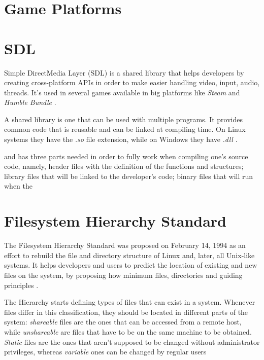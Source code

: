 \section{Game Platforms}
\label {sec:game_platforms}


\section{SDL}
\label {sec:sdl}

Simple DirectMedia Layer (SDL) is a shared library that helps developers by creating cross-platform APIs in order to make easier handling video, input, audio, threads. It's used in several games available in big platforms like \textit{Steam} and \textit{Humble Bundle} \cite{sdl2017}.

A shared library is one that can be used with multiple programs. It provides common code that is reusable and can be linked at compiling time. On Linux systems they have the \textit{.so} file extension, while on Windows they have \textit{.dll} \cite{howto2017shared}.

and has three parts needed in order to fully work when compiling one's source code, namely, header files with the definition of the functions and structures; library files that will be linked to the developer's code; binary files that will run when the


\section{Filesystem Hierarchy Standard}
\label {sec:fhs}

The Filesystem Hierarchy Standard was proposed on February 14, 1994 as an effort to rebuild the file and directory structure of Linux and, later, all Unix-like systems. It helps developers and users to predict the location of existing and new files on the system, by proposing how minimum files, directories and guiding principles \cite{allbery2015filesystem}.

The Hierarchy starts defining types of files that can exist in a system. Whenever files differ in this classification, they should be located in different parts of the system: \textit{shareable} files are the ones that can be accessed from a remote host, while \textit{unshareable} are files that have to be on the same machine to be obtained. \textit{Static} files are the ones that aren't supposed to be changed without administrator privileges, whereas \textit{variable} ones can be changed by regular users \cite{allbery2015filesystem}

